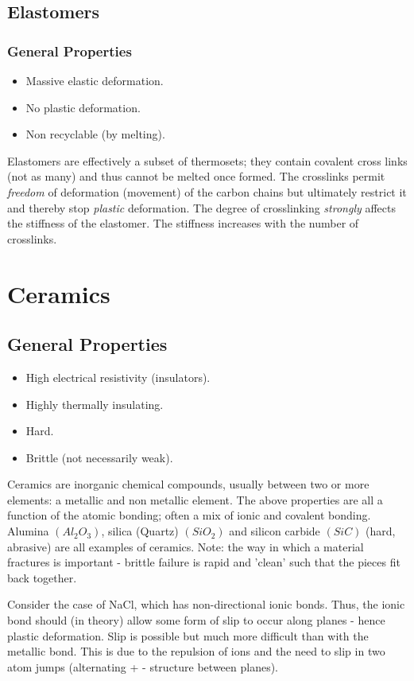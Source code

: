 \documentclass[class=report, crop=false, 12pt,a4paper]{standalone}
\begin{document}
\subsection{Elastomers}
\subsubsection{General Properties}
\begin{itemize}[noitemsep]
  \item Massive elastic deformation.
  \item No plastic deformation.
  \item Non recyclable (by melting).
\end{itemize}
Elastomers are effectively a subset of thermosets; they contain covalent cross links (not as many) and thus cannot be melted once formed. The crosslinks permit \emph{freedom} of deformation (movement) of the carbon chains but ultimately restrict it and thereby stop \emph{plastic} deformation. The degree of crosslinking \emph{strongly} affects the stiffness of the elastomer. The stiffness increases with the number of crosslinks. 
\section{Ceramics}
\subsection{General Properties}
\begin{itemize}[noitemsep]
  \item High electrical resistivity (insulators).
  \item Highly thermally insulating.
  \item Hard.
  \item Brittle (not necessarily weak).
\end{itemize}
Ceramics are inorganic chemical compounds, usually between two or more elements: a metallic and non metallic element. The above properties are all a function of the atomic bonding; often a mix of ionic and covalent bonding. Alumina \((Al_2O_3)\), silica (Quartz) \((SiO_2)\) and silicon carbide \((SiC)\) (hard, abrasive) are all examples of ceramics. Note: the way in which a material fractures is important - brittle failure is rapid and 'clean' such that the pieces fit back together.

Consider the case of NaCl, which has non-directional ionic bonds. Thus, the ionic bond should (in theory) allow some form of slip to occur along planes - hence plastic deformation. Slip is possible but much more difficult than with the metallic bond. This is due to the repulsion of ions and the need to slip in two atom jumps (alternating + - structure between planes).
\end{document}
